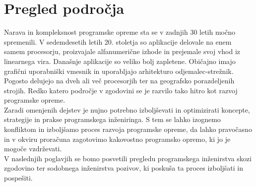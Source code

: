 \documentclass[a4paper,12pt,openright]{book}
\begin{document}
\chapter{Pregled področja} \label{chap:pregled}
Narava in kompleksnost programske opreme sta se v zadnjih 30 letih močno spremenili. V sedemdesetih letih 20. stoletja so aplikacije delovale na enem samem procesorju, proizvajale alfanumerične izhode in prejemale svoj vhod iz linearnega vira. Današnje aplikacije so veliko bolj zapletene. Običajno imajo grafični uporabniški vmesnik in uporabljajo arhitekturo odjemalec-strežnik. Pogosto delujejo na dveh ali več procesorjih ter na geografsko porazdeljenih strojih. Redko katero področje v zgodovini se je  razvilo tako hitro kot razvoj programske opreme. \cite{aggarwal2005software}
\\
Zaradi omenjenih dejstev je nujno potrebno izboljševati in optimizirati koncepte, strategije in prakse programskega inženiringa. S tem se lahko izognemo konfliktom in izboljšamo proces razvoja programske opreme, da lahko pravočasno in v okviru proračuna zagotovimo kakovostno programsko opremo, ki jo je mogoče vzdrževati. \\
V naslednjih poglavjih se bomo posvetili pregledu programskega inženirstva skozi zgodovino ter sodobnega inženirstva pozivov, ki poskuša ta proces izboljšati in pospešiti. 
\pagebreak
\end{document}
